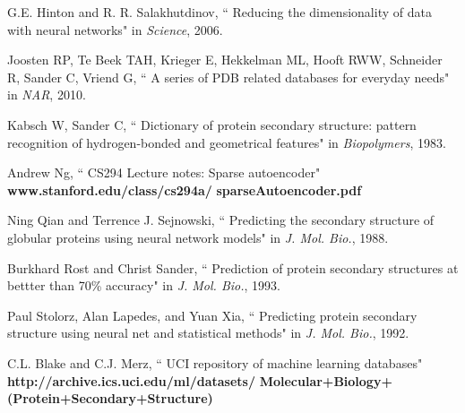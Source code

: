 \documentclass[letterpaper,twocolumn,12pt]{article}
\begin{document}
\begin{thebibliography}{9}


G.E. Hinton and R. R. Salakhutdinov,
   `` Reducing the dimensionality of data with neural networks"
   in \emph{Science}, 2006.

Joosten RP, Te Beek TAH, Krieger E, Hekkelman ML, Hooft RWW, Schneider R, Sander C, Vriend G,
   `` A series of PDB related databases for everyday needs"
   in \emph{NAR}, 2010.

Kabsch W, Sander C,
   `` Dictionary of protein secondary structure: pattern recognition of hydrogen-bonded and geometrical features"
   in \emph{Biopolymers}, 1983.

Andrew Ng,
   `` CS294 Lecture notes: Sparse autoencoder"
   \textbf{www.stanford.edu/class/cs294a/}
   \textbf{sparseAutoencoder.pdf}

Ning Qian and Terrence J. Sejnowski,
  `` Predicting the secondary structure of globular proteins using neural network models"
  in \emph{J. Mol. Bio.}, 1988.

Burkhard Rost and Christ Sander,
  `` Prediction of protein secondary structures at bettter than 70\% accuracy"
  in \emph{J. Mol. Bio.}, 1993.

Paul Stolorz, Alan Lapedes, and Yuan Xia,
   `` Predicting protein secondary structure using neural net and statistical methods"
   in \emph{J. Mol. Bio.}, 1992.

   C.L. Blake and C.J. Merz,
   `` UCI repository of machine learning databases"
   \textbf{http://archive.ics.uci.edu/ml/datasets/}
   \textbf{Molecular+Biology+}
   \textbf{(Protein+Secondary+Structure)}

\end{thebibliography}
\end{document}
